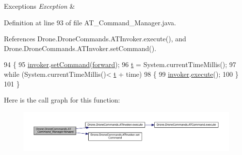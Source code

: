 \begin{DoxyExceptions}{Exceptions}
{\em Exception} & \\
\hline
\end{DoxyExceptions}


Definition at line 93 of file A\+T\+\_\+\+Command\+\_\+\+Manager.\+java.



References Drone.\+Drone\+Commands.\+A\+T\+Invoker.\+execute(), and Drone.\+Drone\+Commands.\+A\+T\+Invoker.\+set\+Command().


\begin{DoxyCode}
94     \{
95         \hyperlink{class_drone_1_1_drone_commands_1_1_a_t___command___manager_a642a1ab26cb9c2df925c2a62d9c15d44}{invoker}.\hyperlink{class_drone_1_1_drone_commands_1_1_a_t_invoker_af32f17db8eb3a66a6f3d05ec7e00ef0b}{setCommand}(\hyperlink{class_drone_1_1_drone_commands_1_1_a_t___command___manager_a73bf7a9109943dceafd6ca5c7d99d47c}{forward});
96         \hyperlink{class_drone_1_1_drone_commands_1_1_a_t___command___manager_ae17b2729d7c785eebb2af3ada7069efe}{t} = System.currentTimeMillis();
97         \textcolor{keywordflow}{while} (System.currentTimeMillis()< \hyperlink{class_drone_1_1_drone_commands_1_1_a_t___command___manager_ae17b2729d7c785eebb2af3ada7069efe}{t} + time)
98         \{
99             \hyperlink{class_drone_1_1_drone_commands_1_1_a_t___command___manager_a642a1ab26cb9c2df925c2a62d9c15d44}{invoker}.\hyperlink{class_drone_1_1_drone_commands_1_1_a_t_invoker_a0dfcc8b67f8642820b66411954452d06}{execute}();
100         \}
101     \}
\end{DoxyCode}


Here is the call graph for this function\+:\nopagebreak
\begin{figure}[H]
\begin{center}
\leavevmode
\includegraphics[width=350pt]{class_drone_1_1_drone_commands_1_1_a_t___command___manager_aff74ba72cc5ad2c2a0be2e379dfb2999_cgraph}
\end{center}
\end{figure}


\hypertarget{class_drone_1_1_drone_commands_1_1_a_t___command___manager_abcd19295e17d6e48da7a216bce99cddc}{}
